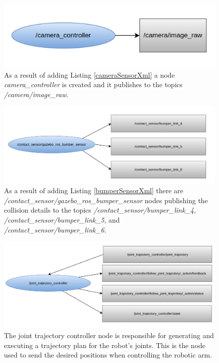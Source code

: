 \documentclass[12pt,oneside]{article}
\begin{document}
\begin{figure}[H]
\centering
\includegraphics[width=0.85\linewidth]{rosgraph02_new}
\caption[The camera\_controller node.]{As a result of adding Listing \ref{cameraSensorXml} a node \textit{camera\_controller} is created and it publishes to the topics \textit{/camera/image\_raw}.}
\label{fig:rosgraph02}
\end{figure}

\begin{figure}[H]
\centering
\includegraphics[width=0.95\linewidth]{rosgraph03_new}
\caption[The /contact\_sensor/gazebo\_ros\_bumper\_sensor node.]{As a result of adding Listing \ref{bumperSensorXml} there are \textit{/contact\_sensor/gazebo\_ros\_bumper\_sensor} nodes publishing the collision details to the topics \textit{/contact\_sensor/bumper\_link\_4}, \textit{/contact\_sensor/bumper\_link\_5}, and\textit{ /contact\_sensor/bumper\_link\_6}. }
\label{fig:rosgraph03}
\end{figure}

\begin{figure}[H]
\centering
\includegraphics[width=0.95\linewidth]{rosgraph04_new}
\caption[The /joint\_trajectory\_controller node.]{The joint trajectory controller node is responsible for generating and executing a trajectory plan for the robot's joints. This is the node used to send the desired positions when controlling the robotic arm.}
\label{fig:rosgraph04}
\end{figure}
\end{document}
